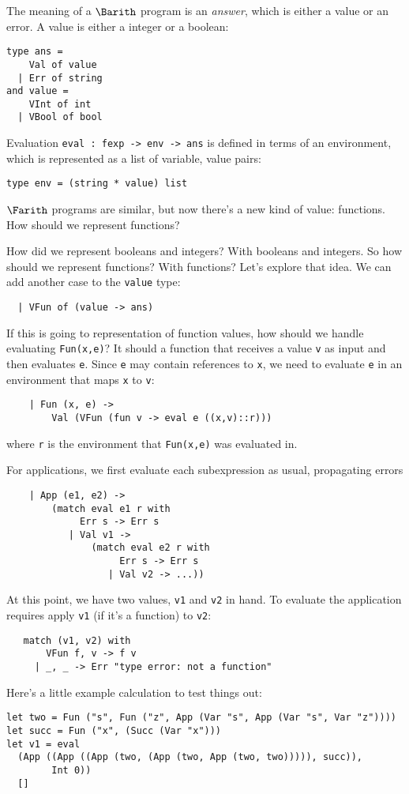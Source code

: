 The meaning of a $\Barith$ program is an \emph{answer}, which is
either a value or an error.  A value is either a integer or a boolean:
\begin{verbatim}
type ans =
    Val of value
  | Err of string
and value = 
    VInt of int
  | VBool of bool
\end{verbatim}
Evaluation {\tt eval : fexp -> env -> ans} is defined in terms of an
environment, which is represented as a list of variable, value pairs:
\begin{verbatim}
type env = (string * value) list
\end{verbatim}


$\Farith$ programs are similar, but now there's a new kind of value:
functions.  How should we represent functions?

How did we represent booleans and integers?  With booleans and
integers.  So how should we represent functions?  With functions?
Let's explore that idea.  We can add another case to the {\tt value}
type:
\begin{verbatim}
  | VFun of (value -> ans)
\end{verbatim}
If this is going to representation of function values, how should we
handle evaluating {\tt Fun(x,e)}?  It should a function that receives
a value {\tt v} as input and then evaluates {\tt e}.  Since {\tt e}
may contain references to {\tt x}, we need to evaluate {\tt e} in an
environment that maps {\tt x} to {\tt v}:
\begin{verbatim}
    | Fun (x, e) -> 
        Val (VFun (fun v -> eval e ((x,v)::r)))
\end{verbatim}
where {\tt r} is the environment that {\tt Fun(x,e)} was evaluated in.

For applications, we first evaluate each subexpression as usual,
propagating errors
\begin{verbatim}
    | App (e1, e2) ->
        (match eval e1 r with
             Err s -> Err s
           | Val v1 ->
               (match eval e2 r with
                    Err s -> Err s
                  | Val v2 -> ...))
\end{verbatim}
At this point, we have two values, {\tt v1} and {\tt v2} in hand.  To
evaluate the application requires apply {\tt v1} (if it's a function)
to {\tt v2}:
\begin{verbatim}
   match (v1, v2) with 
       VFun f, v -> f v
     | _, _ -> Err "type error: not a function"
\end{verbatim}

Here's a little example calculation to test things out:
\begin{verbatim}
let two = Fun ("s", Fun ("z", App (Var "s", App (Var "s", Var "z"))))
let succ = Fun ("x", (Succ (Var "x")))
let v1 = eval 
  (App ((App ((App (two, (App (two, App (two, two))))), succ)), 
        Int 0))
  []
\end{verbatim}
